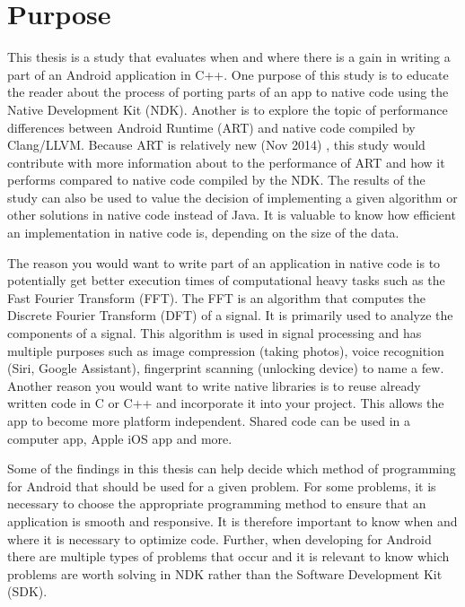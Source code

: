 \section{Purpose}
This thesis is a study that evaluates when and where there is a gain in writing a part of an Android application in C++. One purpose of this study is to educate the reader about the process of porting parts of an app to native code using the Native Development Kit (NDK). Another is to explore the topic of performance differences between Android Runtime (ART) and native code compiled by Clang/LLVM. Because ART is relatively new (Nov 2014) \cite{android:dalvik:release}, this study would contribute with more information about to the performance of ART and how it performs compared to native code compiled by the NDK. The results of the study can also be used to value the decision of implementing a given algorithm or other solutions in native code instead of Java. It is valuable to know how efficient an implementation in native code is, depending on the size of the data.

The reason you would want to write part of an application in native code is to potentially get better execution times of computational heavy tasks such as the Fast Fourier Transform (FFT). The FFT is an algorithm that computes the Discrete Fourier Transform (DFT) of a signal. It is primarily used to analyze the components of a signal. This algorithm is used in signal processing and has multiple purposes such as image compression (taking photos), voice recognition (Siri, Google Assistant), fingerprint scanning (unlocking device) to name a few. Another reason you would want to write native libraries is to reuse already written code in C or C++ and incorporate it into your project. This allows the app to become more platform independent. Shared code can be used in a computer app, Apple iOS app and more.

Some of the findings in this thesis can help decide which method of programming for Android that should be used for a given problem. For some problems, it is necessary to choose the appropriate programming method to ensure that an application is smooth and responsive. It is therefore important to know when and where it is necessary to optimize code. Further, when developing for Android there are multiple types of problems that occur and it is relevant to know which problems are worth solving in NDK rather than the Software Development Kit (SDK).


